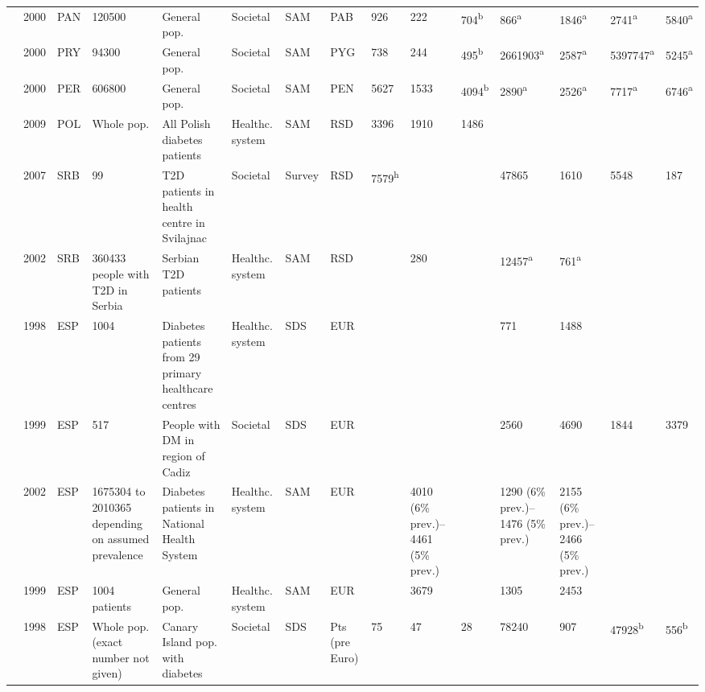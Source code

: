 \documentclass[12pt,english]{article}
\begin{document}
\begin{appendix}
\begin{landscape}
\begin{tabularx}{\linewidth}{Z X X Z Z X X X X X X X X Y Y}
\textcite{Barcelo2003} & 2000 & PAN & 120500 & General pop. & Societal & SAM & PAB & 926 & 222 & 704\textsuperscript{b} & 866\textsuperscript{a} & 1846\textsuperscript{a} & 2741\textsuperscript{a} & 5840\textsuperscript{a} \\
\textcite{Barcelo2003} & 2000 & PRY & 94300 & General pop. & Societal & SAM & PYG & 738 & 244 & 495\textsuperscript{b} & 2661903\textsuperscript{a} & 2587\textsuperscript{a} & 5397747\textsuperscript{a} & 5245\textsuperscript{a} \\
\textcite{Barcelo2003} & 2000 & PER & 606800 & General pop. & Societal & SAM & PEN & 5627 & 1533 & 4094\textsuperscript{b} & 2890\textsuperscript{a} & 2526\textsuperscript{a} & 7717\textsuperscript{a} & 6746\textsuperscript{a} \\
\textcite{Lesniowska2014} & 2009 & POL & Whole pop. & All Polish diabetes patients & Healthc. system & SAM & RSD & 3396 & 1910 & 1486 &  &  &  &  \\
\textcite{Biorac2009a} & 2007 & SRB & 99 & T2D patients in health centre in Svilajnac & Societal & Survey & RSD & 7579\textsuperscript{h} &  &  & 47865 & 1610 & 5548 & 187 \\
\textcite{Bjegovic2007b} & 2002 & SRB & 360433 people with T2D in Serbia & Serbian T2D patients & Healthc. system & SAM & RSD &  & 280 &  & 12457\textsuperscript{a} & 761\textsuperscript{a} &  &  \\
\textcite{Mata2002a} & 1998 & ESP & 1004 & Diabetes patients from 29 primary   healthcare centres & Healthc. system & SDS & EUR &  &  &  & 771 & 1488 &  &  \\
\textcite{Ballesta2006} & 1999 & ESP & 517 & People with DM in region of Cadiz & Societal & SDS & EUR &  &  &  & 2560 & 4690 & 1844 & 3379 \\
\textcite{Oliva2004a} & 2002 & ESP & 1675304 to 2010365 depending on assumed   prevalence & Diabetes patients in National Health System & Healthc. system & SAM & EUR &  & 4010 (6\% prev.)--4461 (5\% prev.) &  & 1290 (6\% prev.)--1476 (5\% prev.) & 2155 (6\% prev.)--2466 (5\% prev.) &  &  \\
\textcite{Jonsson2002b} & 1999 & ESP & 1004 patients & General pop. & Healthc. system & SAM & EUR &  & 3679 &  & 1305 & 2453 &  &  \\
\textcite{LopezBastida2002a} & 1998 & ESP & Whole pop. (exact number not given) & Canary Island pop. with diabetes & Societal & SDS & Pts (pre Euro) & 75 & 47 & 28 & 78240 & 907 & 47928\textsuperscript{b} & 556\textsuperscript{b} \\

\end{tabularx}
\end{landscape}
\end{appendix}
\end{document}
